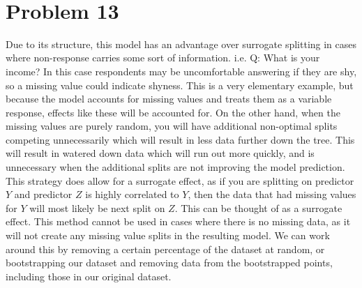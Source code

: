 \documentclass[11pt]{article}
\begin{document}
\begin{center}

\ \\
\end{center}


\section*{Problem 13}

\vspace{5 mm}
\noindent
Due to its structure, this model has an advantage over surrogate splitting in cases where non-response carries some sort of information.  i.e. Q: What is your income? In this case respondents may be uncomfortable answering if they are shy, so a missing value could indicate shyness.  This is a very elementary example, but because the model accounts for missing values and treats them as a variable response, effects like these will be accounted for.  On the other hand, when the missing values are purely random, you will have additional non-optimal splits competing unnecessarily which will result in less data further down the tree.  This will result in watered down data which will run out more quickly, and is unnecessary when the additional splits are not improving the model prediction.  This strategy does allow for a surrogate effect, as if you are splitting on predictor $Y$ and predictor $Z$ is highly correlated to $Y$, then the data that had missing values for $Y$ will most likely be next split on $Z$.  This can be thought of as a surrogate effect.  This method cannot be used in cases where there is no missing data, as it will not create any missing value splits in the resulting model.  We can work around this by removing a certain percentage of the dataset at random, or bootstrapping our dataset and removing data from the bootstrapped points, including those in our original dataset.
\end{document}
